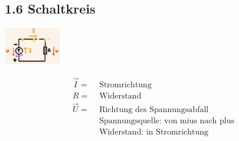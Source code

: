\subsection*{1.6 Schaltkreis}
\vspace{-1mm}
\begin{minipage}{0.49\linewidth}
    \begin{footnotesize}
        \begin{center}
            \vspace{2mm}
            \includegraphics[width = 25mm]{src/images/schaltkreis.png}
        \end{center}
    \end{footnotesize}
\end{minipage}
\begin{minipage}{0.5\linewidth}
    \begin{scriptsize}
        \begin{center}
            \begin{align*}
                \vec{I} = &\text{ Stromrichtung}
                \\R = &\text{ Widerstand} 
                \\\vec{U} = &\text{ Richtung des Spannungsabfall}
                \\&\text{ Spannungsquelle: von mius nach plus}
                \\&\text{ Widerstand: in Stromrichtung}
            \end{align*}
        \end{center}
    \end{scriptsize}
\end{minipage}
\vfill

